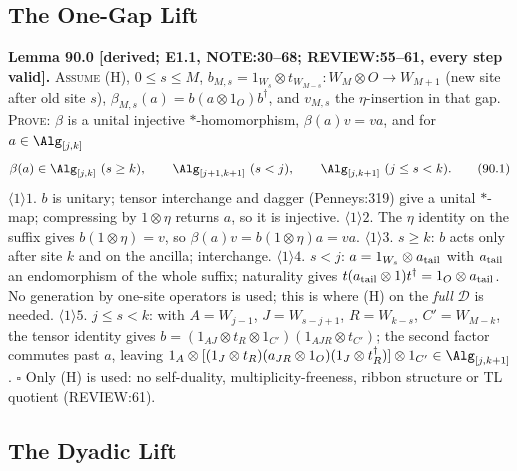 \subsection{The One-Gap Lift}

\textbf{Lemma 90.0 [derived; E1.1, NOTE:30--68; REVIEW:55--61, every step valid].}  \textsc{Assume} (H), \(0\le s\le M\),
\(b_{M,s}=1_{W_s}\otimes t_{W_{M-s}}:W_M\otimes O\to W_{M+1}\) (new site after old site \(s\)),
\(\beta_{M,s}(a)=b(a\otimes1_O)b^\dagger\), and \(v_{M,s}\) the \(\eta\)-insertion in that gap.  \textsc{Prove}: \(\beta\) is a
unital injective \(*\)-homomorphism, \(\beta(a)v=va\), and for \(a\in\Alg_{[j,k]}\)
\[
 \beta(a)\in\Alg_{[j,k]}\ (s\ge k),\qquad \Alg_{[j+1,k+1]}\ (s<j),\qquad \Alg_{[j,k+1]}\ (j\le s<k). \tag{90.1}
\]
\(\langle1\rangle1\). \(b\) is unitary; tensor interchange and dagger (Penneys:319) give a unital \(*\)-map; compressing by
\(1\otimes\eta\) returns \(a\), so it is injective.
\(\langle1\rangle2\). The \(\eta\) identity on the suffix gives \(b(1\otimes\eta)=v\), so \(\beta(a)v=b(1\otimes\eta)a=va\).
\(\langle1\rangle3\). \(s\ge k\): \(b\) acts only after site \(k\) and on the ancilla; interchange.
\(\langle1\rangle4\). \(s<j\): \(a=1_{W_s}\otimes a_{\rm tail}\) with \(a_{\rm tail}\) an endomorphism of the whole suffix;
naturality gives \(t(a_{\rm tail}\otimes1)t^\dagger=1_O\otimes a_{\rm tail}\).  No generation by one-site operators is used;
this is where (H) on the \emph{full} \(\mathcal D\) is needed.
\(\langle1\rangle5\). \(j\le s<k\): with \(A=W_{j-1}\), \(J=W_{s-j+1}\), \(R=W_{k-s}\), \(C'=W_{M-k}\), the tensor identity gives
\(b=(1_{AJ}\otimes t_R\otimes1_{C'})(1_{AJR}\otimes t_{C'})\); the second factor commutes past \(a\), leaving
\(1_A\otimes[(1_J\otimes t_R)(a_{JR}\otimes1_O)(1_J\otimes t_R^\dagger)]\otimes1_{C'}\in\Alg_{[j,k+1]}\).  \(\square\)
Only (H) is used: no self-duality, multiplicity-freeness, ribbon structure or TL quotient (REVIEW:61).

\subsection{The Dyadic Lift}

